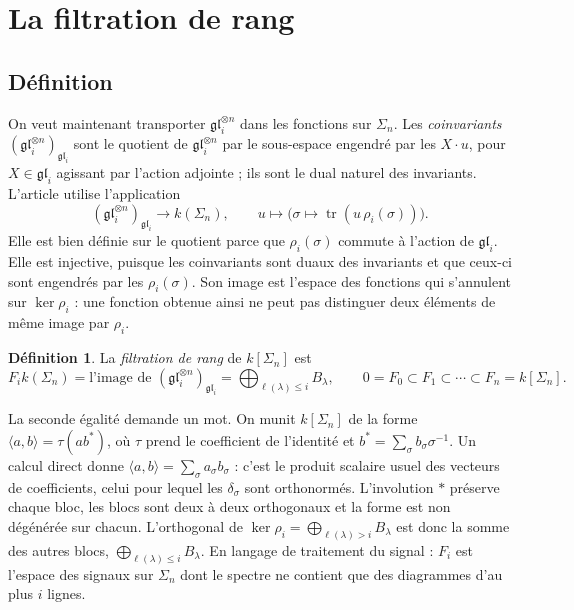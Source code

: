 \documentclass[11pt,a4paper]{amsart}
\theoremstyle{definition}
\newtheorem{definition}{Définition}
\theoremstyle{plain}
\theoremstyle{remark}
\newcommand{\gl}{\mathfrak{gl}}
\newcommand{\tr}{\operatorname{tr}}
\begin{document}
\section{La filtration de rang}

\subsection{Définition}

On veut maintenant transporter $\gl_i^{\otimes n}$ dans les fonctions sur $\Sigma_n$. Les \emph{coinvariants} $(\gl_i^{\otimes n})_{\gl_i}$ sont le quotient de $\gl_i^{\otimes n}$ par le sous-espace engendré par les $X \cdot u$, pour $X \in \gl_i$ agissant par l'action adjointe ; ils sont le dual naturel des invariants. L'article utilise l'application
\[
(\gl_i^{\otimes n})_{\gl_i} \to k(\Sigma_n), \qquad u \mapsto \bigl(\sigma \mapsto \tr(u\, \rho_i(\sigma))\bigr).
\]
Elle est bien définie sur le quotient parce que $\rho_i(\sigma)$ commute à l'action de $\gl_i$. Elle est injective, puisque les coinvariants sont duaux des invariants et que ceux-ci sont engendrés par les $\rho_i(\sigma)$. Son image est l'espace des fonctions qui s'annulent sur $\ker \rho_i$ : une fonction obtenue ainsi ne peut pas distinguer deux éléments de même image par $\rho_i$.

\begin{definition}
La \emph{filtration de rang} de $k[\Sigma_n]$ est
\[
F_i k(\Sigma_n) = \text{l'image de } (\gl_i^{\otimes n})_{\gl_i} = \bigoplus_{\ell(\lambda) \le i} B_\lambda, \qquad 0 = F_0 \subset F_1 \subset \cdots \subset F_n = k[\Sigma_n].
\]
\end{definition}

La seconde égalité demande un mot. On munit $k[\Sigma_n]$ de la forme $\langle a, b \rangle = \tau(a b^*)$, où $\tau$ prend le coefficient de l'identité et $b^* = \sum_\sigma b_\sigma \sigma^{-1}$. Un calcul direct donne $\langle a, b \rangle = \sum_\sigma a_\sigma b_\sigma$ : c'est le produit scalaire usuel des vecteurs de coefficients, celui pour lequel les $\delta_\sigma$ sont orthonormés. L'involution $*$ préserve chaque bloc, les blocs sont deux à deux orthogonaux et la forme est non dégénérée sur chacun. L'orthogonal de $\ker \rho_i = \bigoplus_{\ell(\lambda) > i} B_\lambda$ est donc la somme des autres blocs, $\bigoplus_{\ell(\lambda) \le i} B_\lambda$. En langage de traitement du signal : $F_i$ est l'espace des signaux sur $\Sigma_n$ dont le spectre ne contient que des diagrammes d'au plus $i$ lignes.
\end{document}
